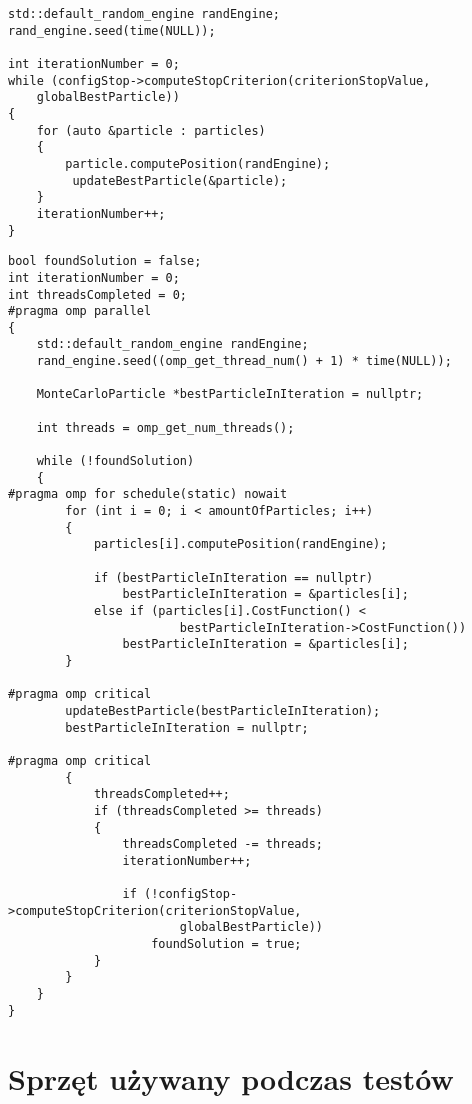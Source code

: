 \documentclass[11pt, a4paper, oneside]{article}
\begin{document}
\begin{lstlisting}[style=mycpp, label=code:mc_before, caption={Optymalizacja Monte Carlo - kod sekwencyjny.}]
std::default_random_engine randEngine;
rand_engine.seed(time(NULL));

int iterationNumber = 0;
while (configStop->computeStopCriterion(criterionStopValue,
    globalBestParticle))
{
    for (auto &particle : particles)
    {
        particle.computePosition(randEngine);
         updateBestParticle(&particle);
    }
    iterationNumber++;
}
\end{lstlisting}

\begin{lstlisting}[style=mycpp, label=code:mc_after, caption={Optymalizacja Monte Carlo - kod równoległy.}]
bool foundSolution = false;
int iterationNumber = 0;
int threadsCompleted = 0;
#pragma omp parallel
{
    std::default_random_engine randEngine;
    rand_engine.seed((omp_get_thread_num() + 1) * time(NULL));

    MonteCarloParticle *bestParticleInIteration = nullptr;

    int threads = omp_get_num_threads();

    while (!foundSolution)
    {
#pragma omp for schedule(static) nowait
        for (int i = 0; i < amountOfParticles; i++)
        {
            particles[i].computePosition(randEngine);

            if (bestParticleInIteration == nullptr)
                bestParticleInIteration = &particles[i];
            else if (particles[i].CostFunction() <
                        bestParticleInIteration->CostFunction())
                bestParticleInIteration = &particles[i];
        }

#pragma omp critical
        updateBestParticle(bestParticleInIteration);
        bestParticleInIteration = nullptr;

#pragma omp critical
        {
            threadsCompleted++;
            if (threadsCompleted >= threads)
            {
                threadsCompleted -= threads;
                iterationNumber++;

                if (!configStop->computeStopCriterion(criterionStopValue,
                        globalBestParticle))
                    foundSolution = true;
            }
        }
    }
}
\end{lstlisting}

\section{Sprzęt używany podczas testów} 
\end{document}
